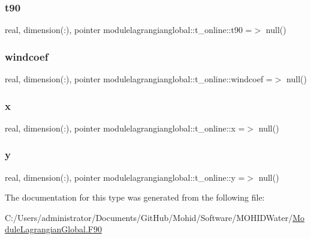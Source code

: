 \subsubsection{\texorpdfstring{t90}{t90}}
{\footnotesize\ttfamily real, dimension(\+:), pointer modulelagrangianglobal\+::t\+\_\+online\+::t90 =$>$ null()\hspace{0.3cm}{\ttfamily [private]}}

\mbox{\label{structmodulelagrangianglobal_1_1t__online_aa564fd4e10ea88483cb95f3d22a9a84f}} 
\subsubsection{\texorpdfstring{windcoef}{windcoef}}
{\footnotesize\ttfamily real, dimension(\+:), pointer modulelagrangianglobal\+::t\+\_\+online\+::windcoef =$>$ null()\hspace{0.3cm}{\ttfamily [private]}}

\mbox{\label{structmodulelagrangianglobal_1_1t__online_aa16c4deeab046eb1fb18cef78d4a34a8}} 
\subsubsection{\texorpdfstring{x}{x}}
{\footnotesize\ttfamily real, dimension(\+:), pointer modulelagrangianglobal\+::t\+\_\+online\+::x =$>$ null()\hspace{0.3cm}{\ttfamily [private]}}

\mbox{\label{structmodulelagrangianglobal_1_1t__online_aec5f694091cde9a0671071dbd7f6aed5}} 
\subsubsection{\texorpdfstring{y}{y}}
{\footnotesize\ttfamily real, dimension(\+:), pointer modulelagrangianglobal\+::t\+\_\+online\+::y =$>$ null()\hspace{0.3cm}{\ttfamily [private]}}



The documentation for this type was generated from the following file\+:\begin{DoxyCompactItemize}
\item 
C\+:/\+Users/administrator/\+Documents/\+Git\+Hub/\+Mohid/\+Software/\+M\+O\+H\+I\+D\+Water/\mbox{\hyperlink{_module_lagrangian_global_8_f90}{Module\+Lagrangian\+Global.\+F90}}\end{DoxyCompactItemize}
